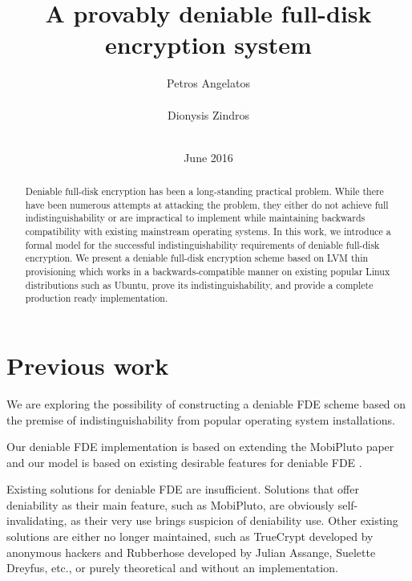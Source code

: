 \documentclass{acm_proc_article-sp}
\begin{document}
\title{A provably deniable full-disk encryption system}

\author{
\alignauthor
Petros Angelatos\\
       \\
\alignauthor
Dionysis Zindros\\
       \\
}

\date{June 2016}

\maketitle
\begin{abstract}
Deniable full-disk encryption has been a long-standing practical problem. While
there have been numerous attempts at attacking the problem, they either do not
achieve full indistinguishability or are impractical to implement while
maintaining backwards compatibility with existing mainstream operating systems.
In this work, we introduce a formal model for the successful
indistinguishability requirements of deniable full-disk encryption. We present
a deniable full-disk encryption scheme based on LVM thin provisioning which
works in a backwards-compatible manner on existing popular Linux distributions
such as Ubuntu, prove its indistinguishability, and provide a complete
production ready implementation.
\end{abstract}

\section{Previous work}

We are exploring the possibility of constructing a deniable FDE scheme based on
the premise of indistinguishability from popular operating system
installations.

Our deniable FDE implementation is based on extending the MobiPluto paper
\cite{c0} and our model is based on existing desirable features for deniable
FDE \cite{c1}.

Existing solutions for deniable FDE are insufficient. Solutions that offer
deniability as their main feature, such as MobiPluto, are obviously
self-invalidating, as their very use brings suspicion of deniability use. Other
existing solutions are either no longer maintained, such as TrueCrypt \cite{c5}
developed by anonymous hackers and Rubberhose \cite{c6} developed by Julian
Assange, Suelette Dreyfus, etc., or purely theoretical and without an
implementation.
\end{document}
